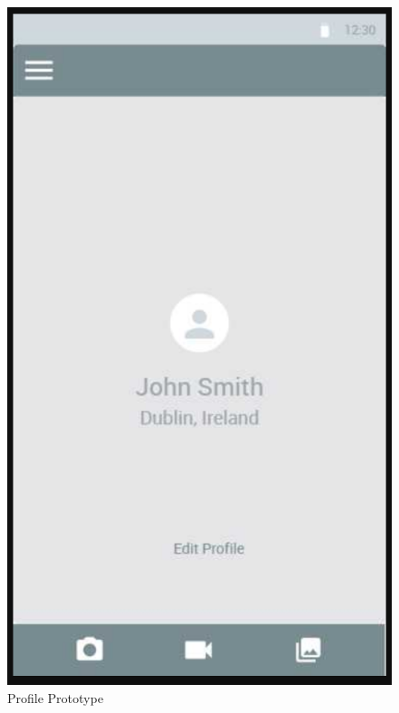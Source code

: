\begin{figure}[h!]
\begin{minipage}[t]{0.48\textwidth}
\includegraphics[width=\linewidth,keepaspectratio=true]{img/profile_mock.PNG}
\caption{Profile Prototype}
\label{fig:Profile Prototype}
\end{minipage}
\hspace*{\fill} %
\begin{minipage}[t]{0.48\textwidth}

\end{minipage}
\end{figure}
